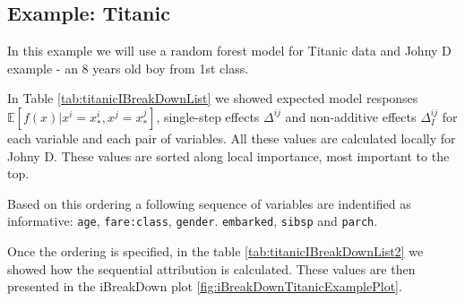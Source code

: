 \documentclass[12pt,]{krantz}
\theoremstyle{definition}
\theoremstyle{definition}
\theoremstyle{definition}
\theoremstyle{remark}
\begin{document}
\hypertarget{example-titanic-1}{%
\subsection{Example: Titanic}\label{example-titanic-1}}

In this example we will use a random forest model for Titanic data and
Johny D example - an 8 years old boy from 1st class.

In Table \ref{tab:titanicIBreakDownList} we showed expected model
responses \(\mathbb{E}[f(x)|x^i = x_*^i, x^j = x_*^j]\), single-step
effects \(\Delta^{ij}\) and non-additive effects \(\Delta_{I}^{ij}\) for
each variable and each pair of variables. All these values are
calculated locally for Johny D. These values are sorted along local
importance, most important to the top.

Based on this ordering a following sequence of variables are indentified
as informative: \texttt{age}, \texttt{fare:class}, \texttt{gender}.
\texttt{embarked}, \texttt{sibsp} and \texttt{parch}.

Once the ordering is specified, in the table
\ref{tab:titanicIBreakDownList2} we showed how the sequential
attribution is calculated. These values are then presented in the
iBreakDown plot \ref{fig:iBreakDownTitanicExamplePlot}.
\end{document}
